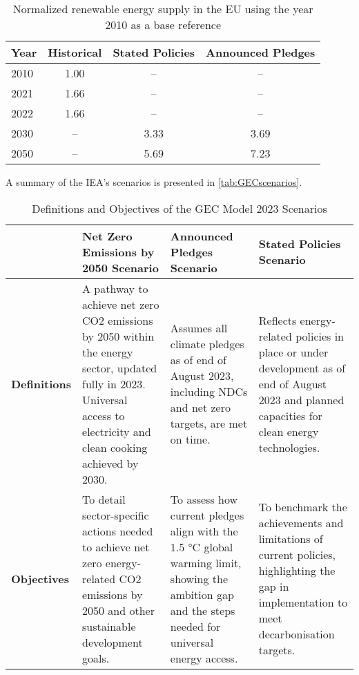 \begin{table}[h!]
    \centering
    \small
    \caption{Normalized renewable energy supply in the EU using the year 2010 as a base reference}
    \label{tab:iea_energy_data}
    \begin{tabular}{lccc}
        \hline
        Year & Historical & Stated Policies & Announced Pledges \\
        \hline
        2010 & 1.00       & --              & --                \\
        2021 & 1.66       & --              & --                \\
        2022 & 1.66       & --              & --                \\
        2030 & --         & 3.33            & 3.69              \\
        2050 & --         & 5.69            & 7.23              \\
        \hline
    \end{tabular}
\end{table}

A summary of the IEA's scenarios is presented in \autoref{tab:GECscenarios}.

\begin{table}[h!]
    \centering
    \small
    \caption{Definitions and Objectives of the GEC Model 2023 Scenarios}\label{tab:GECscenarios}
    \begin{tabular}{p{4cm}p{3.5cm}p{3.5cm}p{3.5cm}}
        \hline
                             & \textbf{Net Zero Emissions by 2050 Scenario}                                                                                                                             & \textbf{Announced Pledges Scenario}                                                                                                                  & \textbf{Stated Policies Scenario}                                                                                                             \\
        \hline
        \textbf{Definitions} & A pathway to achieve net zero CO2 emissions by 2050 within the energy sector, updated fully in 2023. Universal access to electricity and clean cooking achieved by 2030. & Assumes all climate pledges as of end of August 2023, including NDCs and net zero targets, are met on time.                                          & Reflects energy-related policies in place or under development as of end of August 2023 and planned capacities for clean energy technologies. \\
        \hline
        \textbf{Objectives}  & To detail sector-specific actions needed to achieve net zero energy-related CO2 emissions by 2050 and other sustainable development goals.                               & To assess how current pledges align with the 1.5 °C global warming limit, showing the ambition gap and the steps needed for universal energy access. & To benchmark the achievements and limitations of current policies, highlighting the gap in implementation to meet decarbonisation targets.    \\
        \hline
    \end{tabular}
\end{table}

